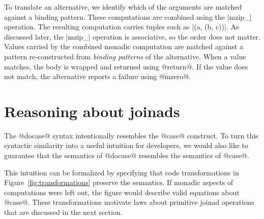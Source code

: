 \documentclass[preprint]{sigplanconf}
\begin{document}
To translate an alternative, we identify which of the arguments are matched against
a binding pattern. These computations are combined using the |mzip_| operation. The resulting 
computation carries tuples such as |(a, (b, c))|. As discussed later, the |mzip_| operation is 
associative, so the order does not matter. Values carried by the combined monadic computation 
are matched against a pattern re-constructed from \textit{binding patterns} of the alternative. 
When a value matches, the body is wrapped and returned using @return@. If the value does not match, 
the alternative reports a failure using @mzero@.


\section{Reasoning about joinads}
\label{sec:reasoning}

The @docase@ syntax intentionally resembles the @case@ construct. To turn this syntactic similarity 
into a useful intuition for developers, we would also like to guarantee that the semantics of 
@docase@ resembles the semantics of @case@. 

This intuition can be formalized by specifying that code transformations in Figure~\ref{fig:transformations} 
preserve the semantics. If monadic aspects of computations were left out, the figure would describe 
valid equations about @case@. These transformations motivate laws about primitive joinad operations 
that are discussed in the next section. 
\end{document}
